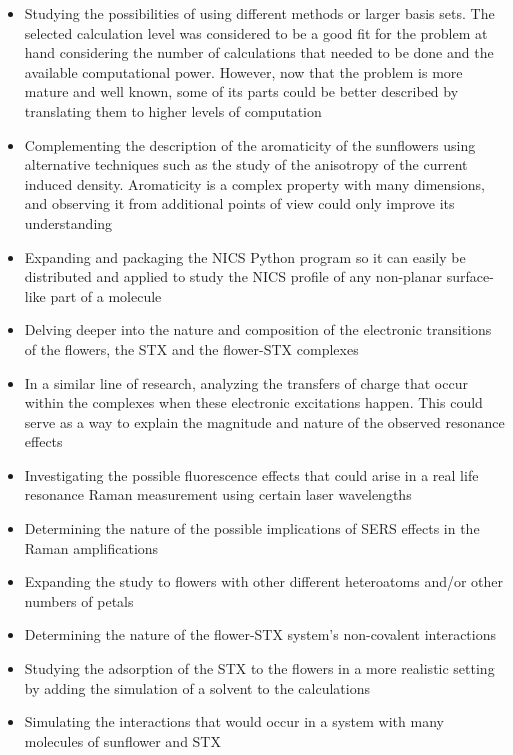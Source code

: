 \begin{itemize}
    \item Studying the possibilities of using different methods or larger basis sets. The selected calculation level was considered to be a good fit for the problem at hand considering the number of calculations that needed to be done and the available computational power. However, now that the problem is more mature and well known, some of its parts could be better described by translating them to higher levels of computation
    \item Complementing the description of the aromaticity of the sunflowers using alternative techniques such as the study of the anisotropy of the current induced density. Aromaticity is a complex property with many dimensions, and observing it from additional points of view could only improve its understanding
    \item Expanding and packaging the NICS Python program so it can easily be distributed and applied to study the NICS profile of any non-planar surface-like part of a molecule
    \item Delving deeper into the nature and composition of the electronic transitions of the flowers, the STX and the flower-STX complexes
    \item In a similar line of research, analyzing the transfers of charge that occur within the complexes when these electronic excitations happen. This could serve as a way to explain the magnitude and nature of the observed resonance effects
    \item Investigating the possible fluorescence effects that could arise in a real life resonance Raman measurement using certain laser wavelengths
    \item Determining the nature of the possible implications of SERS effects in the Raman amplifications
    \item Expanding the study to flowers with other different heteroatoms and/or other numbers of petals
    \item Determining the nature of the flower-STX system's non-covalent interactions
    \item Studying the adsorption of the STX to the flowers in a more realistic setting by adding the simulation of a solvent to the calculations
    \item Simulating the interactions that would occur in a system with many molecules of sunflower and STX
\end{itemize}

